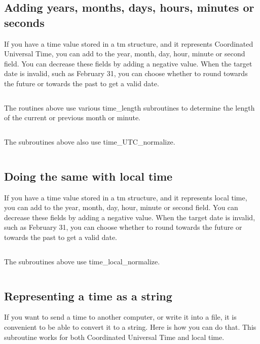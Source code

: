 \documentclass[letterpaper,twoside]{article}
\begin{document}
\subsection{Adding years, months, days, hours, minutes or seconds}
\label{subsection:timeUTCadd}
If you have a time value stored in a {\ttfamily tm} structure, and it represents
Coordinated Universal Time, you can add to the year, month, day, hour,
minute or second field.  You can decrease these fields by adding a
negative value.  When the target date is invalid, such as February 31,
you can choose whether to round towards the future or towards the past
to get a valid date.
\inputminted[firstline=32]{c}{time_utc_add.c}
The routines above use various time\_length subroutines to determine
the length of the current or previous month or minute.
\inputminted[firstline=32]{c}{time_length.c}

The subroutines above also use time\_UTC\_normalize.
\inputminted[firstline=32]{c}{time_utc_normalize.c}

\subsection{Doing the same with local time}
\label{subsection:timelocaladd}
If you have a time value stored in a {\ttfamily tm} structure, and it represents
local time, you can add to the year, month, day, hour, minute or
second field.  You can decrease these fields by adding a negative
value.  When the target date is invalid, such as February 31,
you can choose whether to round towards the future or towards the past
to get a valid date.
\inputminted[firstline=32]{c}{time_local_add.c}
The subroutines above use time\_local\_normalize.
\inputminted[firstline=32]{c}{time_local_normalize.c}

\subsection{Representing a time as a string}
\label{subsection:tostring}
If you want to send a time to another computer, or write it into a file,
it is convenient to be able to convert it to a string.  Here is how you
can do that.  This subroutine works for both Coordinated Universal Time
and local time.
\inputminted[firstline=34]{c}{time_tm_to_string.c}
\end{document}
